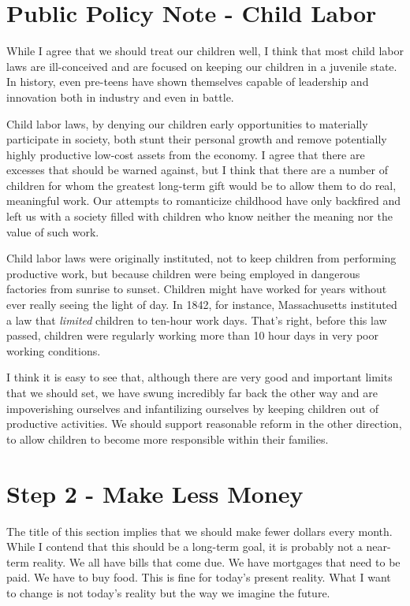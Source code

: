 \section{Public Policy Note - Child Labor}

While I agree that we should treat our children well, I think that most
child labor laws are ill-conceived and are focused on keeping our
children in a juvenile state. In history, even pre-teens have shown
themselves capable of leadership and innovation both in industry and
even in battle. 

Child labor laws, by denying our children early opportunities to
materially participate in society, both stunt their personal growth and
remove potentially highly productive low-cost assets from the economy.
I agree that there are excesses that should be warned against, but I
think that there are a number of children for whom the greatest
long-term gift would be to allow them to do real, meaningful work. Our
attempts to romanticize childhood have only backfired and left us with
a society filled with children who know neither the meaning nor the
value of such work.

Child labor laws were originally instituted, not to keep children from
performing productive work, but because children were being employed in
dangerous factories from sunrise to sunset. Children might
have
worked for years
without ever really seeing the light of day. In 1842, for instance,
Massachusetts instituted a law that \textit{limited} children to
ten-hour work days. That’s right, before this law passed, children were
regularly working more than 10 hour days in very poor working
conditions.

I think it is easy to see that, although there are very good and
important limits that we should set, we have swung incredibly far back
the other way and are impoverishing ourselves and infantilizing
ourselves by keeping children out of productive activities. We should
support reasonable reform in the other direction, to allow children to
become more responsible within their families. 

\section{Step 2 - Make Less Money}

The title of this section implies that we should make fewer dollars
every month. While I contend that this should be a long-term goal, it
is probably not a near-term reality. We all have bills that come due.
We have mortgages that need to be paid. We have to buy food. This is
fine for today’s present reality. What I want to change is not
today’s reality but
the way we imagine the future.

